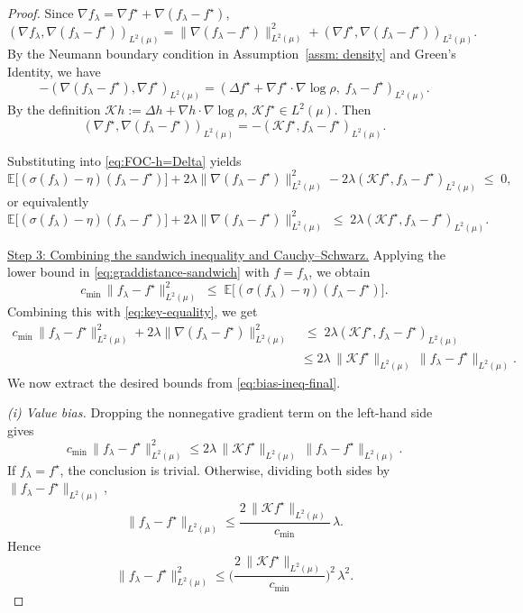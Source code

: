 \documentclass[11pt]{article}
\newcommand{\E}{\mathbb{E}}
\theoremstyle{plain}
\theoremstyle{definition}
\theoremstyle{remark}
\newcommand{\proofstep}[1]{\par\medskip\noindent\uline{#1}}
\begin{document}
\begin{proof}
Since \(\nabla f_\lambda=\nabla f^\star+\nabla(f_\lambda-f^\star)\),
\[
  (\nabla f_\lambda,\nabla(f_\lambda-f^\star))_{L^2(\mu)}
  = \|\nabla(f_\lambda-f^\star)\|_{L^2(\mu)}^2
    + (\nabla f^\star,\nabla(f_\lambda-f^\star))_{L^2(\mu)}.
\]
By the Neumann boundary condition in Assumption~\ref{assm: density} and Green's Identity, we have
\[
  -(\nabla(f_\lambda-f^\star),\nabla f^\star)_{L^2(\mu)}
  = (\Delta f^\star + \nabla f^\star\cdot\nabla\log \rho,\;
     f_\lambda-f^\star)_{L^2(\mu)}.
\]
By the definition
\(\mathcal K h:=\Delta h+\nabla h\cdot\nabla\log\rho\),
\(\mathcal K f^\star\in L^2(\mu)\).
Then
\[
  (\nabla f^\star,\nabla(f_\lambda-f^\star))_{L^2(\mu)}
  = - (\mathcal K f^\star,f_\lambda-f^\star)_{L^2(\mu)}.
\]

Substituting into \eqref{eq:FOC-h=Delta} yields
\[
  \E\big[(\sigma(f_\lambda)-\eta)(f_\lambda-f^\star)\big]
  + 2\lambda\|\nabla(f_\lambda-f^\star)\|_{L^2(\mu)}^2
  - 2\lambda(\mathcal K f^\star,f_\lambda-f^\star)_{L^2(\mu)}
  \;\le\; 0,
\]
or equivalently
\begin{equation}
  \E\big[(\sigma(f_\lambda)-\eta)(f_\lambda-f^\star)\big]
  + 2\lambda\|\nabla(f_\lambda-f^\star)\|_{L^2(\mu)}^2
  \;\le\; 2\lambda(\mathcal K f^\star,f_\lambda-f^\star)_{L^2(\mu)}.
  \label{eq:key-equality}
\end{equation}

\proofstep{Step 3: Combining the sandwich inequality and Cauchy--Schwarz.}
Applying the lower bound in
\eqref{eq:graddistance-sandwich} with $f=f_\lambda$,
we obtain
\[
  c_{\min}\,\|f_\lambda-f^\star\|_{L^2(\mu)}^2
  \;\le\;
  \E\big[(\sigma(f_\lambda)-\eta)(f_\lambda-f^\star)\big].
\]
Combining this with \eqref{eq:key-equality}, we get
\begin{equation}
\begin{aligned}
    c_{\min}\,\|f_\lambda-f^\star\|_{L^2(\mu)}^2
  + 2\lambda\|\nabla(f_\lambda-f^\star)\|_{L^2(\mu)}^2
  &\;\le\;
  2\lambda(\mathcal K f^\star,f_\lambda-f^\star)_{L^2(\mu)}\\
  &\le
  2\lambda \,\|\mathcal K f^\star\|_{L^2(\mu)}\,\|f_\lambda-f^\star\|_{L^2(\mu)}.
    \label{eq:bias-ineq-final}
\end{aligned}
\end{equation}
We now extract the desired bounds from
\eqref{eq:bias-ineq-final}.

\smallskip\noindent
\emph{(i) Value bias.}
Dropping the nonnegative gradient term on the left-hand side gives
\[
  c_{\min}\,\|f_\lambda-f^\star\|_{L^2(\mu)}^2
  \le
  2\lambda \,\|\mathcal K f^\star\|_{L^2(\mu)}\,\|f_\lambda-f^\star\|_{L^2(\mu)}.
\]
If \(f_\lambda=f^\star\), the conclusion is trivial.
Otherwise, dividing both sides by \(\|f_\lambda-f^\star\|_{L^2(\mu)}\),
\[
  \|f_\lambda-f^\star\|_{L^2(\mu)}
  \le \frac{2\,\|\mathcal K f^\star\|_{L^2(\mu)}}{c_{\min}}\,\lambda.
\]
Hence
\begin{equation}
  \|f_\lambda-f^\star\|_{L^2(\mu)}^2
  \le \Big(\frac{2\,\|\mathcal K f^\star\|_{L^2(\mu)}}{c_{\min}}\Big)^2\,\lambda^2.
  \label{eq:bias-value}
\end{equation}


\end{proof}
\end{document}
